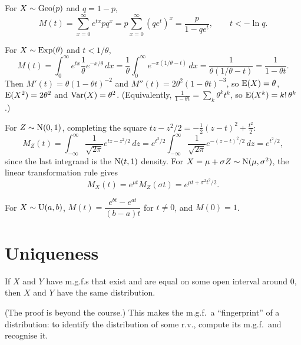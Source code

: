 \begin{example}[Geometric]
For $X\sim\operatorname{Geo}(p)$ and $q = 1-p$,
\[
  M(t) = \sum_{x=0}^\infty e^{tx}pq^x = p\sum_{x=0}^\infty(qe^t)^x = \frac{p}{1-qe^t},
  \qquad t < -\ln q.
\]
\end{example}

\begin{example}[Exponential]
For $X\sim\operatorname{Exp}(\theta)$ and $t<1/\theta$,
\[
  M(t) = \int_0^\infty e^{tx}\frac1\theta e^{-x/\theta}\,dx = \frac{1}{\theta}\int_0^\infty
  e^{-x(1/\theta - t)}\,dx = \frac{1}{\theta(1/\theta - t)} = \frac{1}{1-\theta t}.
\]
Then $M'(t) = \theta(1-\theta t)^{-2}$ and $M''(t) = 2\theta^2(1-\theta t)^{-3}$, so
$\operatorname{E}(X) = \theta$, $\operatorname{E}(X^2) = 2\theta^2$ and $\operatorname{Var}(X) = \theta^2$. (Equivalently,
$\frac{1}{1-\theta t} = \sum_k \theta^kt^k$, so $\operatorname{E}(X^k) = k!\,\theta^k$.)
\end{example}

\begin{example}[Normal]
For $Z\sim\operatorname{N}(0,1)$, completing the square $tz - z^2/2 = -\frac12(z-t)^2 + \frac{t^2}{2}$:
\[
  M_Z(t) = \int_{-\infty}^\infty\frac{1}{\sqrt{2\pi}}e^{tz - z^2/2}\,dz =
  e^{t^2/2}\int_{-\infty}^\infty\frac{1}{\sqrt{2\pi}}e^{-(z-t)^2/2}\,dz = e^{t^2/2},
\]
since the last integrand is the $\operatorname{N}(t,1)$ density. For $X = \mu + \sigma Z\sim\operatorname{N}(\mu,
\sigma^2)$, the linear transformation rule gives
\[
  M_X(t) = e^{\mu t}M_Z(\sigma t) = e^{\mu t + \sigma^2t^2/2}.
\]
\end{example}

\begin{example}
For $X\sim\operatorname{U}(a,b)$, $M(t) = \dfrac{e^{bt} - e^{at}}{(b-a)t}$ for $t\ne0$, and $M(0)=1$.
\end{example}

\section{Uniqueness}

\begin{theorem}
If $X$ and $Y$ have m.g.f.s that exist and are equal on some open interval around $0$,
then $X$ and $Y$ have the same distribution.
\end{theorem}

(The proof is beyond the course.) This makes the m.g.f.\ a ``fingerprint'' of a
distribution: to identify the distribution of some r.v., compute its m.g.f.\ and recognise
it.

